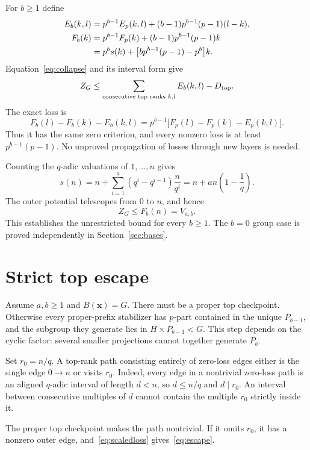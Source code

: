 \documentclass[11pt,letterpaper]{article}
\theoremstyle{definition}\newtheorem{definition}{Definition}
\begin{document}
For $b\ge1$ define
\begin{align}
E_b(k,l)&=p^{b-1}E_p(k,l)+(b-1)p^{b-1}(p-1)(l-k),\label{eq:collapsededge}\\
F_b(k)&=p^{b-1}F_p(k)+(b-1)p^{b-1}(p-1)k\notag\\
&=p^bs(k)+\bigl[bp^{b-1}(p-1)-p^b\bigr]k.\label{eq:collapsedpotential}
\end{align}
Equation~\eqref{eq:collapse} and its interval form give
\begin{equation}
Z_G\le\sum_{\text{consecutive top ranks }k,l}E_b(k,l)-D_{\rm top}.\label{eq:outerbound}
\end{equation}
The exact loss is
\begin{equation}
F_b(l)-F_b(k)-E_b(k,l)=p^{b-1}\bigl[F_p(l)-F_p(k)-E_p(k,l)\bigr].\label{eq:scaledloss}
\end{equation}
Thus it has the same zero criterion, and every nonzero loss is at least $p^{b-1}(p-1)$. No unproved propagation of losses through new layers is needed.

Counting the $q$-adic valuations of $1,\ldots,n$ gives
\[
s(n)=n+\sum_{i=1}^{a}(q^i-q^{i-1})\frac{n}{q^i}
=n+an\left(1-\frac1q\right).
\]
The outer potential telescopes from $0$ to $n$, and hence
\begin{equation}
Z_G\le F_b(n)=V_{a,b}.\label{eq:upper}
\end{equation}
This establishes the unrestricted bound for every $b\ge1$. The $b=0$ group case is proved independently in Section~\ref{sec:bases}.

\section{Strict top escape}\label{sec:escape}
Assume $a,b\ge1$ and $B(\mathbf{x})=G$. There must be a proper top checkpoint. Otherwise every proper-prefix stabilizer has $p$-part contained in the unique $P_{b-1}$, and the subgroup they generate lies in $H\times P_{b-1}<G$. This step depends on the cyclic factor: several smaller projections cannot together generate $P_b$.

Set $r_0=n/q$. A top-rank path consisting entirely of zero-loss edges either is the single edge $0\to n$ or visits $r_0$. Indeed, every edge in a nontrivial zero-loss path is an aligned $q$-adic interval of length $d<n$, so $d\le n/q$ and $d\mid r_0$. An interval between consecutive multiples of $d$ cannot contain the multiple $r_0$ strictly inside it.

The proper top checkpoint makes the path nontrivial. If it omits $r_0$, it has a nonzero outer edge, and~\eqref{eq:scaledloss} gives~\eqref{eq:escape}.
\end{document}

